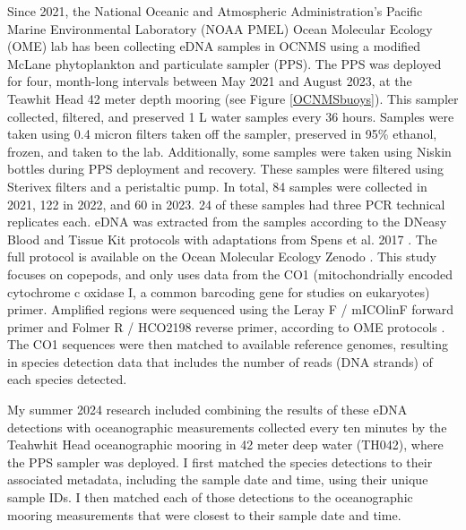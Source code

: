 \documentclass[12pt,twoside]{reedthesis}
\begin{document}
{Since 2021, the National Oceanic and Atmospheric Administration's Pacific Marine Environmental Laboratory (NOAA PMEL) Ocean Molecular Ecology (OME) lab has been collecting eDNA samples in OCNMS using a modified McLane phytoplankton and particulate sampler (PPS).  The PPS was deployed for four, month-long intervals between May 2021 and August 2023, at the Teawhit Head 42 meter depth mooring (see Figure \ref{OCNMSbuoys}). This sampler collected, filtered, and preserved 1 L water samples every 36 hours. Samples were taken using 0.4 micron filters taken off the sampler, preserved in 95\% ethanol, frozen, and taken to the lab. Additionally, some samples were taken using Niskin bottles during PPS deployment and recovery. These samples were filtered using Sterivex filters and a peristaltic pump. In total, 84 samples were collected in 2021, 122 in 2022, and 60 in 2023. 24 of these samples had three PCR technical replicates each. eDNA was extracted from the samples according to the DNeasy Blood and Tissue Kit protocols with adaptations from Spens et al. 2017 \autocite{Spens2017}. The full protocol is available on the Ocean Molecular Ecology Zenodo \autocite{Weinrich2025}. This study focuses on copepods, and only uses data from the CO1 (mitochondrially encoded cytochrome c oxidase I, a common barcoding gene for studies on eukaryotes) primer. Amplified regions were sequenced using the  Leray F / mICOlinF forward primer and Folmer R / HCO2198 reverse primer, according to OME protocols \autocite{Gold2024, Spens2017}. The CO1 sequences were then matched to available reference genomes, resulting in species detection data that includes the number of reads (DNA strands) of each species detected.

My summer 2024 research included combining the results of these eDNA detections with oceanographic measurements collected every ten minutes by the Teahwhit Head oceanographic mooring in 42 meter deep water (TH042), where the PPS sampler was deployed. I first matched the species detections to their associated metadata, including the sample date and time, using their unique sample IDs. I then matched each of those detections to the oceanographic mooring measurements that were closest to their sample date and time.  

}
\end{document}
